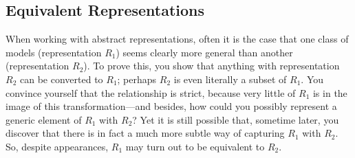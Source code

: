 

\subsection{Equivalent Representations}


When working with abstract representations, often it is the case that one class of models (representation $R_1$) seems clearly more general than another (representation $R_2$).
To prove this, you show that anything with representation $R_2$ can be converted to $R_1$; perhaps $R_2$ is even literally a subset of $R_1$. 
You convince yourself that the relationship is strict, because very little of $R_1$ is in the image of this transformation---and besides, how could you possibly represent a generic element of $R_1$ with $R_2$? 
Yet it is still possible that, sometime later,
you discover that there is in fact a much more subtle way of capturing $R_1$ with $R_2$. 
So, despite appearances, $R_1$ may turn out to be equivalent to $R_2$. 

